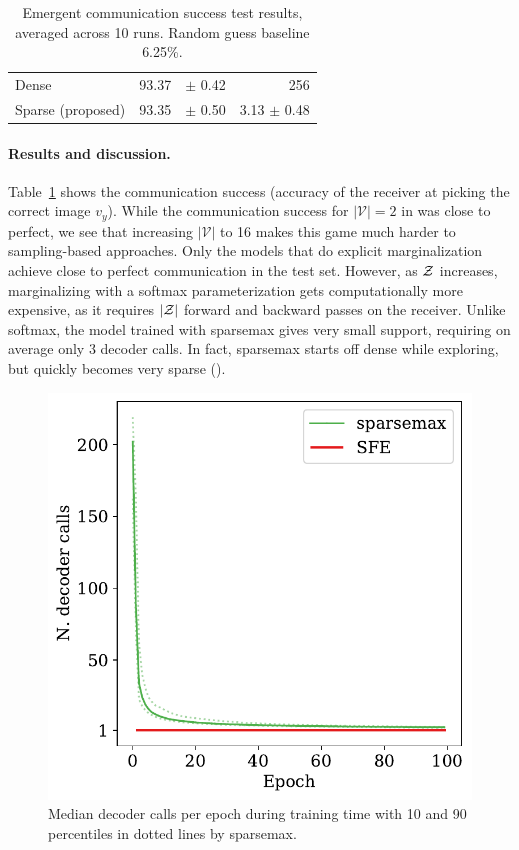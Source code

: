 \begin{table}[t]
\begin{center}
\begin{tabular}{lrrr}
            Dense                                  & 93.37\!\!\!\!\!\!\!\!\!\!\!\!\!\!\!\!\!\!\!\!\!\!\!\!\!\!\!\!\!\!\!\!\!\!\!\!\!\!\!\!\!\!\!\!\!\!\!\! & {\color{gray}$\pm$ \phantom{1}0.42} & 256                              \\
            Sparse {\small \color{gray}(proposed)} & 93.35\!\!\!\!\!\!\!\!\!\!\!\!\!\!\!\!\!\!\!\!\!\!\!\!\!\!\!\!\!\!\!\!\!\!\!\!\!\!\!\!\!\!\!\!\!\!\!\! & {\color{gray}$\pm$ \phantom{1}0.50} & 3.13\,\,{\color{gray}$\pm$ 0.48} \\
            \bottomrule
        \end{tabular}
    \end{center}
    \caption[Emergent communication success test results.]{Emergent communication success test results,
        averaged across 10 runs. Random guess baseline 6.25\%.}
    \label{tab:symbol}
\end{table}

\paragraph*{Results and discussion.}
Table~\ref{tab:symbol} shows the communication success (accuracy of
the receiver at picking the correct image $v_y$). While the
communication success for $|\mathcal{V}|=2$ in \citet{Lazaridou2017}
was close to perfect, we see that increasing $|\mathcal{V}|$ to 16
makes this game much harder to sampling-based approaches.
Only the models that do explicit marginalization achieve close to
perfect communication in the test set. However, as $\mathcal{Z}$ increases,
marginalizing with a softmax parameterization gets computationally
more expensive, as it requires $|\mathcal{Z}|$ forward and backward passes on
the receiver. Unlike softmax, the model trained with sparsemax
gives very small support, requiring on average only 3 decoder
calls. In fact, sparsemax
starts off dense while exploring, but quickly becomes very sparse
().

\begin{figure}[ht]
    \centering
    \includegraphics[width=0.65\columnwidth]{Figures/sparsemax_nonzero_em_comm.pdf}
    \caption[Median decoder calls per epoch.]{
        Median decoder calls per epoch during training
        time with 10 and 90 percentiles in dotted lines by sparsemax.
    }
    \label{fig:nonzero_comm}
\end{figure}

